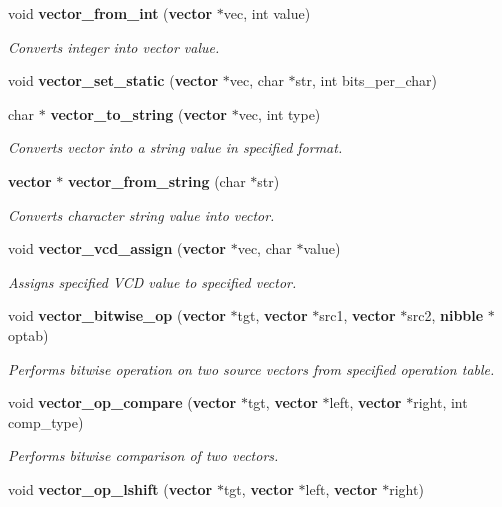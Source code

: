 \begin{CompactItemize}
void {\bf vector\_\-from\_\-int} ({\bf vector} $\ast$vec, int value)
\begin{CompactList}\small\item\em Converts integer into vector value.\item\end{CompactList}\item 
void {\bf vector\_\-set\_\-static} ({\bf vector} $\ast$vec, char $\ast$str, int bits\_\-per\_\-char)
\item 
char $\ast$ {\bf vector\_\-to\_\-string} ({\bf vector} $\ast$vec, int type)
\begin{CompactList}\small\item\em Converts vector into a string value in specified format.\item\end{CompactList}\item 
{\bf vector} $\ast$ {\bf vector\_\-from\_\-string} (char $\ast$str)
\begin{CompactList}\small\item\em Converts character string value into vector.\item\end{CompactList}\item 
void {\bf vector\_\-vcd\_\-assign} ({\bf vector} $\ast$vec, char $\ast$value)
\begin{CompactList}\small\item\em Assigns specified VCD value to specified vector.\item\end{CompactList}\item 
void {\bf vector\_\-bitwise\_\-op} ({\bf vector} $\ast$tgt, {\bf vector} $\ast$src1, {\bf vector} $\ast$src2, {\bf nibble} $\ast$optab)
\begin{CompactList}\small\item\em Performs bitwise operation on two source vectors from specified operation table.\item\end{CompactList}\item 
void {\bf vector\_\-op\_\-compare} ({\bf vector} $\ast$tgt, {\bf vector} $\ast$left, {\bf vector} $\ast$right, int comp\_\-type)
\begin{CompactList}\small\item\em Performs bitwise comparison of two vectors.\item\end{CompactList}\item 
void {\bf vector\_\-op\_\-lshift} ({\bf vector} $\ast$tgt, {\bf vector} $\ast$left, {\bf vector} $\ast$right)

\end{CompactItemize}
